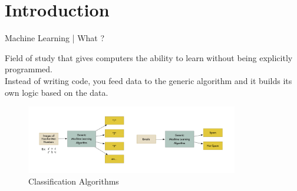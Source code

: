 \documentclass[10pt]{beamer}
\begin{document}
\begingroup
	
	\section{Introduction}
		\begin{frame}{Machine Learning | What ?}
			\begin{center}
				\large{Field of study that gives computers the ability to learn without being explicitly programmed.}\\
				\bigskip
				\small{Instead of writing code, you feed data to the generic algorithm and it builds its own logic based on the data.}
				\begin{figure}
				\centering
				\includegraphics[width=\linewidth,height=30mm]{images/classif-ex}
				\caption[This machine learning algorithm is a black box that can be re-used for lots of different classification problems.]{Classification Algorithms}
				\end{figure}
			\end{center}
		\end{frame}
\end{document}
